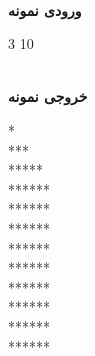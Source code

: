 \documentclass[]{article}
\newcommand{\inputsample}[1]{
    ~\\
    \textbf{ورودی نمونه}
    ~\\
    \begin{tcolorbox}[breakable,boxrule=0pt]
        \begin{latin}
            \large{
                #1
            }
        \end{latin}
    \end{tcolorbox}
}
\newcommand{\outputsample}[1]{
    ~\\
    \textbf{خروجی نمونه}

    \begin{tcolorbox}[breakable,boxrule=0pt]
        \begin{latin}
            \large{
                #1
            }
        \end{latin}
    \end{tcolorbox}
}
\begin{document}
\inputsample{
3 10
}

\outputsample{
\texttt{}\texttt{\char32}\texttt{\char32}\texttt{\char32}\texttt{\char32}\texttt{\char32}\texttt{\char32}\texttt{\char32}\texttt{\char32}\texttt{\char32}*\\
\texttt{\char32}\texttt{\char32}\texttt{\char32}\texttt{\char32}\texttt{\char32}\texttt{\char32}\texttt{\char32}\texttt{\char32}\texttt{\char32}***\\
\texttt{\char32}\texttt{\char32}\texttt{\char32}\texttt{\char32}\texttt{\char32}\texttt{\char32}\texttt{\char32}\texttt{\char32}*****\\
\texttt{\char32}\texttt{\char32}\texttt{\char32}\texttt{\char32}\texttt{\char32}\texttt{\char32}\texttt{\char32}***\texttt{\char32}***\\
\texttt{\char32}\texttt{\char32}\texttt{\char32}\texttt{\char32}\texttt{\char32}\texttt{\char32}***\texttt{\char32}\texttt{\char32}\texttt{\char32}***\\
\texttt{\char32}\texttt{\char32}\texttt{\char32}\texttt{\char32}\texttt{\char32}***\texttt{\char32}\texttt{\char32}\texttt{\char32}\texttt{\char32}\texttt{\char32}***\\
\texttt{\char32}\texttt{\char32}\texttt{\char32}\texttt{\char32}***\texttt{\char32}\texttt{\char32}\texttt{\char32}\texttt{\char32}\texttt{\char32}\texttt{\char32}\texttt{\char32}***\\
\texttt{\char32}\texttt{\char32}\texttt{\char32}***\texttt{\char32}\texttt{\char32}\texttt{\char32}\texttt{\char32}\texttt{\char32}\texttt{\char32}\texttt{\char32}\texttt{\char32}\texttt{\char32}***\\
\texttt{\char32}\texttt{\char32}***\texttt{\char32}\texttt{\char32}\texttt{\char32}\texttt{\char32}\texttt{\char32}\texttt{\char32}\texttt{\char32}\texttt{\char32}\texttt{\char32}\texttt{\char32}\texttt{\char32}***\\
\texttt{\char32}***\texttt{\char32}\texttt{\char32}\texttt{\char32}\texttt{\char32}\texttt{\char32}\texttt{\char32}\texttt{\char32}\texttt{\char32}\texttt{\char32}\texttt{\char32}\texttt{\char32}\texttt{\char32}\texttt{\char32}***\\
***\texttt{\char32}\texttt{\char32}\texttt{\char32}\texttt{\char32}\texttt{\char32}\texttt{\char32}\texttt{\char32}\texttt{\char32}\texttt{\char32}\texttt{\char32}\texttt{\char32}\texttt{\char32}\texttt{\char32}\texttt{\char32}\texttt{\char32}***\\
\texttt{\char32}***\texttt{\char32}\texttt{\char32}\texttt{\char32}\texttt{\char32}\texttt{\char32}\texttt{\char32}\texttt{\char32}\texttt{\char32}\texttt{\char32}\texttt{\char32}\texttt{\char32}\texttt{\char32}\texttt{\char32}***\\
}
\end{document}
